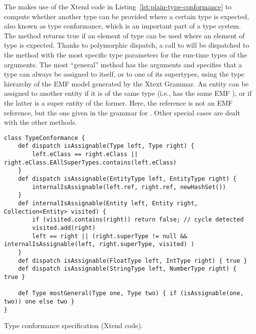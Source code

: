 The  makes use of the Xtend code in
Listing~\ref{lst:plain-type-conformance} to compute whether another type can be
provided where a certain type is expected, also known as type conformance,
which is an important part of a type system. 
The method  returns true if an element of
type  can be used where an element of type  is expected.
Thanks to polymorphic dispatch, a call to  will be
dispatched to the method with the most specific type parameters for the run-time
types of the arguments. The most ``general'' method has the arguments
 and specifies that a type can always be assigned to itself,
or to one of its supertypes, using the type hierarchy of the EMF model generated
by the Xtext Grammar.
An entity can be assigned to another entity if it is of the same type (i.e., has
the same EMF ), or if the latter is a super entity of the former.
Here, the reference  is not an EMF reference, but the one given
in the grammar for . Other special cases are dealt with the
other methods. 

\begin{listing}[tb]
\begin{lstlisting}[language=xtend] 
class TypeConformance {
	def dispatch isAssignable(Type left, Type right) {
		left.eClass == right.eClass || right.eClass.EAllSuperTypes.contains(left.eClass) 
	}
	def dispatch isAssignable(EntityType left, EntityType right) {
		internalIsAssignable(left.ref, right.ref, newHashSet())
	}
	def internalIsAssignable(Entity left, Entity right, Collection<Entity> visited) {
		if (visited.contains(right)) return false; // cycle detected
		visited.add(right)
		left == right || (right.superType != null && internalIsAssignable(left, right.superType, visited) )
	}
	def dispatch isAssignable(FloatType left, IntType right) { true }
	def dispatch isAssignable(StringType left, NumberType right) { true }

	def Type mostGeneral(Type one, Type two) { if (isAssignable(one, two)) one else two }
}
\end{lstlisting}
\caption{Type conformance specification (Xtend code).}
\label{lst:plain-type-conformance}
\end{listing}

